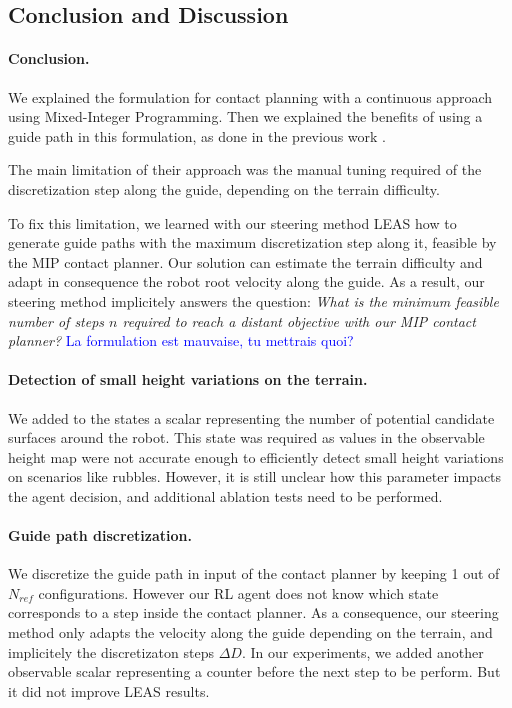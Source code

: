 \subsection{Conclusion and Discussion\label{subsub:mip:discussion}}
\paragraph{Conclusion.}
We explained the formulation for contact planning with a continuous approach using Mixed-Integer Programming.
Then we explained the benefits of using a guide path in this formulation, as done in the previous work \cite{sl1m_v2}.

The main limitation of their approach was the manual tuning required of the discretization step along the guide, depending on the terrain difficulty.

To fix this limitation, we learned with our steering method LEAS how to generate guide paths with the maximum discretization step along it, feasible by the MIP contact planner.
Our solution can estimate the terrain difficulty and adapt in consequence the robot root velocity along the guide.
As a result, our steering method implicitely answers the question: 
\textit{What is the minimum feasible number of steps $n$ required to reach a distant objective with our MIP contact planner?} \textcolor{blue}{La formulation est mauvaise, tu mettrais quoi?}


\paragraph{Detection of small height variations on the terrain.}
We added to the states a scalar representing the number of potential candidate surfaces around the robot.
This state was required as values in the observable height map were not accurate enough to efficiently detect small height variations on scenarios like rubbles.
However, it is still unclear how this parameter impacts the agent decision, and additional ablation tests need to be performed.

\paragraph{Guide path discretization.}
We discretize the guide path in input of the contact planner by keeping 1 out of $N_{ref}$ configurations.
However our RL agent does not know which state corresponds to a step inside the contact planner.
As a consequence, our steering method only adapts the velocity along the guide depending on the terrain, and implicitely the discretizaton steps $\Delta D$.
In our experiments, we added another observable scalar representing a counter before the next step to be perform. 
But it did not improve LEAS results.

